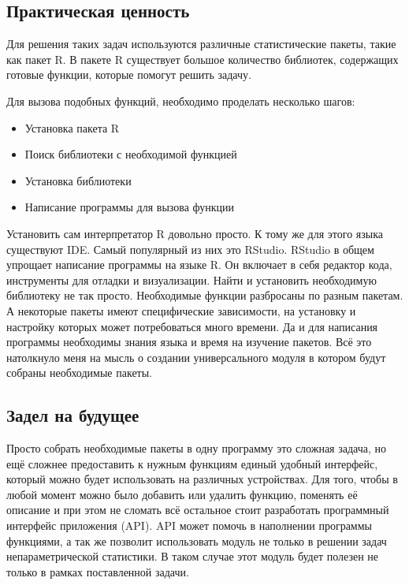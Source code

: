 \documentclass[14pt,a4paper]{scrartcl}
\begin{document}
    \subsection{Практическая ценность}
    Для решения таких задач используются различные статистические пакеты, такие как пакет R.
    В пакете R существует большое количество библиотек, содержащих готовые функции, которые помогут решить задачу.

    Для вызова подобных функций, необходимо проделать несколько шагов:

    \begin{itemize}[noitemsep]
        \item Установка пакета R
        \item Поиск библиотеки с необходимой функцией
        \item Установка библиотеки
        \item Написание программы для вызова функции
    \end{itemize}

    Установить сам интерпретатор R довольно просто.
    К тому же для этого языка существуют IDE.
    Самый популярный из них это RStudio.
    RStudio в общем упрощает написание программы на языке R.
    Он включает в себя редактор кода, инструменты для отладки и визуализации.
    Найти и установить необходимую библиотеку не так просто.
    Необходимые функции разбросаны по разным пакетам.
    А некоторые пакеты имеют специфические зависимости, на установку и настройку которых может потребоваться много времени.
    Да и для написания программы необходимы знания языка и время на изучение пакетов.
    Всё это натолкнуло меня на мысль о создании универсального модуля в котором будут собраны необходимые пакеты.

    \subsection[Задел на будущее]{Задел на будущее}
    Просто собрать необходимые пакеты в одну программу это сложная задача, но ещё сложнее предоставить к нужным функциям единый удобный интерфейс, который можно будет использовать на различных устройствах.
    Для того, чтобы в любой момент можно было добавить или удалить функцию, поменять её описание и при этом не сломать всё остальное стоит разработать программный интерфейс приложения (API).
    API может помочь в наполнении программы функциями, а так же позволит использовать модуль не только в решении задач непараметрической статистики.
    В таком случае этот модуль будет полезен не только в рамках поставленной задачи.
\end{document}

